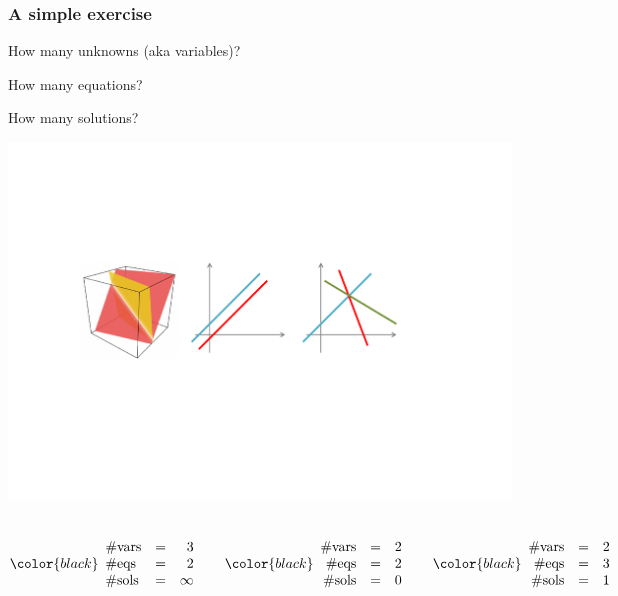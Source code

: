\documentclass[compress]{beamer}
\newcommand{\black}[1]{{\color{black}#1}}
\newcommand{\beq}[1]{\[\black{#1}\]}
\begin{document}

\begin{frame}
\frametitle{A simple exercise}

How many \black{unknowns} (aka variables)?

\vspace{.2cm}

How many \black{equations}?

\vspace{.2cm}

How many \black{solutions}?

\begin{center}
\includegraphics[trim = 40mm 85mm 65mm 60mm, clip, width=\textwidth]{./img/eqs-geometry-2}
\end{center}

\begin{columns}
\beq{
\begin{array}{lrr}
\textrm{\#vars} &=& 3\\
\textrm{\#eqs} &=& 2\\
\textrm{\#sols} &=& \infty\\
\end{array}
}

\beq{
\begin{array}{rrr}
\textrm{\#vars} &=& 2\\
\textrm{\#eqs} &=& 2\\
\textrm{\#sols} &=& 0\\
\end{array}
}

\beq{
\begin{array}{rrr}
\textrm{\#vars} &=& 2\\
\textrm{\#eqs} &=& 3\\
\textrm{\#sols} &=& 1\\
\end{array}
}
\end{columns}

\end{frame}
\end{document}
